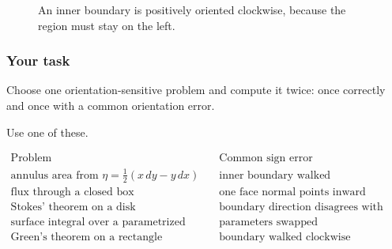 \begin{figure}[h]
\centering
{}
\caption{An inner boundary is positively oriented clockwise, because the region must
stay on the left.}
\end{figure}

\subsubsection*{Your task}

Choose one orientation-sensitive problem and compute it twice: once correctly and once
with a common orientation error.

Use one of these.

\[
\begin{array}{c|c}
\text{Problem} & \text{Common sign error} \\ \hline
\text{annulus area from } \eta=\frac12(x\,dy-y\,dx)
&
\text{inner boundary walked counterclockwise}\\[1mm]
\text{flux through a closed box}
&
\text{one face normal points inward}\\[1mm]
\text{Stokes' theorem on a disk}
&
\text{boundary direction disagrees with normal}\\[1mm]
\text{surface integral over a parametrized surface}
&
\text{parameters swapped}\\[1mm]
\text{Green's theorem on a rectangle}
&
\text{boundary walked clockwise}
\end{array}
\]

